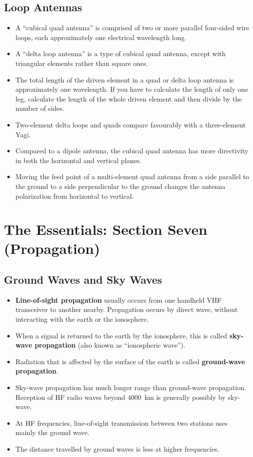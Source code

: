 \documentclass[letterpaper,12pt]{scrartcl}
\begin{document}
\subsection{Loop Antennas}

\begin{itemize}
\item A ``cubical quad antenna'' is comprised of two or more parallel four-sided wire loops, each approximately one electrical wavelength long.
\item A ``delta loop antenna'' is a type of cubical quad antenna, except with triangular elements rather than square ones.
\item The total length of the driven element in a quad or delta loop antenna is approximately one wavelength.
If you have to calculate the length of only one leg, calculate the length of the whole driven element and then divide by the number of sides.
\item Two-element delta loops and quads compare favourably with a three-element Yagi.
\item Compared to a dipole antenna, the cubical quad antenna has more directivity in both the horizontal and vertical planes.
\item Moving the feed point of a multi-element quad antenna from a side parallel to the ground to a side perpendicular to the ground
changes the antenna polarization from horizontal to vertical.
\end{itemize}

\section{The Essentials: Section Seven (Propagation)}

\subsection{Ground Waves and Sky Waves}

\begin{itemize}
\item \textbf{Line-of-sight propagation} usually occurs from one handheld VHF transceiver to another nearby. Propagation occurs by direct wave, without interacting with the earth or the ionosphere.
\item When a signal is returned to the earth by the ionosphere, this is called \textbf{sky-wave propagation} (also known as ``ionospheric wave'').
\item Radiation that is affected by the surface of the earth is called \textbf{ground-wave propagation}.
\item Sky-wave propagation has much longer range than ground-wave propagation. Reception of HF radio waves beyond 4000~km is generally possibly by sky-wave.
\item At HF frequencies, line-of-sight transmission between two stations uses mainly the ground wave.
\item The distance travelled by ground waves is less at higher frequencies.
\end{itemize}
\end{document}
